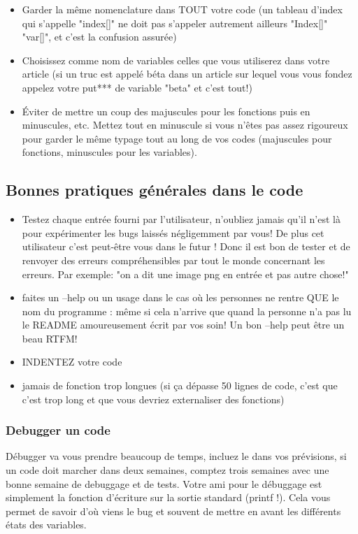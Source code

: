 \begin{itemize}
\item Garder la même nomenclature dans TOUT votre code (un tableau d'index qui s'appelle "index[]" 
ne doit pas s'appeler autrement ailleurs "Index[]" "var[]", et c'est la confusion assurée)
\item Choisissez comme nom de variables celles que vous utiliserez dans votre article 
(si un truc est appelé béta dans un article sur lequel vous vous fondez appelez votre put*** 
de variable "beta" et c'est tout!)
\item Éviter de mettre un coup des majuscules pour les fonctions puis en minuscules, etc.
Mettez tout en minuscule si vous n'êtes pas assez rigoureux pour garder le même typage tout 
au long de vos codes (majuscules pour fonctions, minuscules pour les variables).
\end{itemize}

\subsection{Bonnes pratiques générales dans le code}

\begin{itemize}
\item Testez chaque entrée fourni par l'utilisateur, n'oubliez jamais qu'il 
n'est là pour expérimenter les bugs laissés négligemment par 
vous! De plus cet utilisateur c'est peut-être vous dans 
le futur ! Donc il est bon de tester et de renvoyer des erreurs 
compréhensibles par tout le monde concernant les erreurs. Par exemple: 
"on a dit une image png en entrée et pas autre chose!"
\item faites un --help ou un usage dans le cas où les personnes ne rentre QUE le nom du programme : m\^eme
si cela n'arrive que quand la personne n'a pas lu le README amoureusement écrit par vos soin! Un bon
 --help peut être un beau RTFM!
\item INDENTEZ votre code
\item jamais de fonction trop longues (si ça dépasse 50 lignes de code, c'est que c'est trop
 long et que vous devriez externaliser des fonctions)
\end{itemize}

\subsubsection*{Debugger un code}

Débugger va vous prendre beaucoup de temps, incluez le dans vos prévisions, si un code doit marcher 
dans deux semaines, comptez trois semaines avec une bonne semaine de debuggage et de tests. Votre ami pour
le débuggage est simplement la fonction d'écriture sur la sortie standard (printf !). Cela vous 
permet de savoir d'où  viens le bug et souvent de mettre en avant les différents états des variables.



